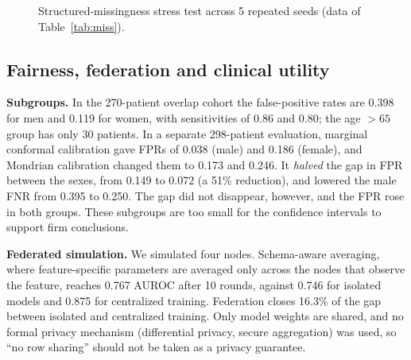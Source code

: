 \documentclass[conference]{IEEEtran}
\newcommand{\sfn}{SchemaFlexTabNet-QC}
\begin{document}
\begin{figure}[t]
\centering
{}
\caption{Structured-missingness stress test across 5 repeated seeds (data of Table~\ref{tab:miss}).}
\label{fig:miss}
\end{figure}

\subsection{Fairness, federation and clinical utility}
\textbf{Subgroups.} In the 270-patient overlap cohort the false-positive rates are 0.398 for men and 0.119 for women, with sensitivities of 0.86 and 0.80; the age $>65$ group has only 30 patients. In a separate 298-patient evaluation, marginal conformal calibration gave FPRs of 0.038 (male) and 0.186 (female), and Mondrian calibration changed them to 0.173 and 0.246. It \emph{halved} the gap in FPR between the sexes, from 0.149 to 0.072 (a 51\% reduction), and lowered the male FNR from 0.395 to 0.250. The gap did not disappear, however, and the FPR rose in both groups. These subgroups are too small for the confidence intervals to support firm conclusions.

\textbf{Federated simulation.} We simulated four nodes. Schema-aware averaging, where feature-specific parameters are averaged only across the nodes that observe the feature, reaches 0.767 AUROC after 10 rounds, against 0.746 for isolated models and 0.875 for centralized training. Federation closes 16.3\% of the gap between isolated and centralized training. Only model weights are shared, and no formal privacy mechanism (differential privacy, secure aggregation) was used, so ``no row sharing'' should not be taken as a privacy guarantee.
\end{document}
